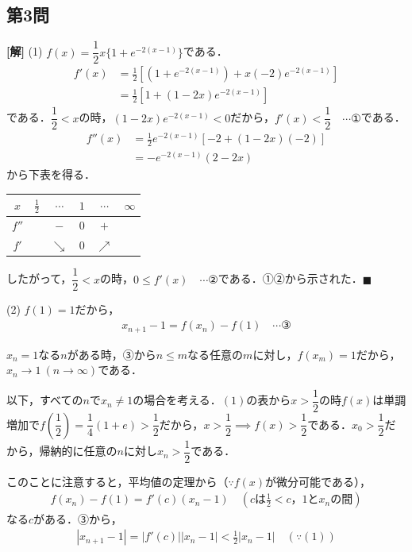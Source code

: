 \documentclass[../main.tex]{subfiles}
\begin{document}
\bigskip

\subsection*{第3問}

\noindent
{\bf [解]}
(1) $f(x)=\dfrac12x\{1+e^{-2(x-1)}\}$である．
\begin{align*}
  f'(x)&=\frac12\left[(1+e^{-2(x-1)})+x(-2)e^{-2(x-1)}\right]\\
  &=\frac12\left[1+(1-2x)e^{-2(x-1)}\right]
\end{align*}
である．$\dfrac12<x$の時，$(1-2x)e^{-2(x-1)}<0$だから，$f'(x)<\dfrac12\quad\cdots①$である．
\begin{align*}
  f''(x)&=\frac12e^{-2(x-1)}\left[-2+(1-2x)(-2)\right]\\
  &=-e^{-2(x-1)}(2-2x)
\end{align*}
から下表を得る．
\begin{center}
  \begin{tabular}{c|ccccc}
    $x$ & $\frac12$ & $\cdots$ & $1$ & $\cdots$ & $\infty$\\
    \hline
    $f''$ & & $-$ & $0$ & $+$ & \\
    $f'$ & & $\searrow$ & $0$ & $\nearrow$ & \\
  \end{tabular}
\end{center}
したがって，$\dfrac12<x$の時，$0\le f'(x)\quad\cdots②$である．①②から示された．$\blacksquare$

(2) $f(1)=1$だから，
\begin{align*}
  x_{n+1}-1=f(x_n)-f(1)\quad\cdots③
\end{align*}

$x_n=1$なる$n$がある時，③から$n\le m$なる任意の$m$に対し，$f(x_m)=1$だから，$x_n\to1\ (n\to\infty)$である．

以下，すべての$n$で$x_n\ne1$の場合を考える．$(1)$の表から$x>\dfrac12$の時$f(x)$は単調増加で$f\left(\dfrac12\right)=\dfrac14(1+e)>\dfrac12$だから，$x>\dfrac12\implies f(x)>\dfrac12$である．$x_0>\dfrac12$だから，帰納的に任意の$n$に対し$x_n>\dfrac12$である．

このことに注意すると，平均値の定理から（$\because f(x)$が微分可能である），
\begin{align*}
  f(x_n)-f(1)=f'(c)(x_n-1)\quad\left(c\text{は}\frac12<c\text{，}1\text{と}x_n\text{の間}\right)
\end{align*}
なる$c$がある．③から，
\begin{align*}
  |x_{n+1}-1|=|f'(c)||x_n-1|<\frac12|x_n-1|\quad(\because(1))
\end{align*}
\end{document}
